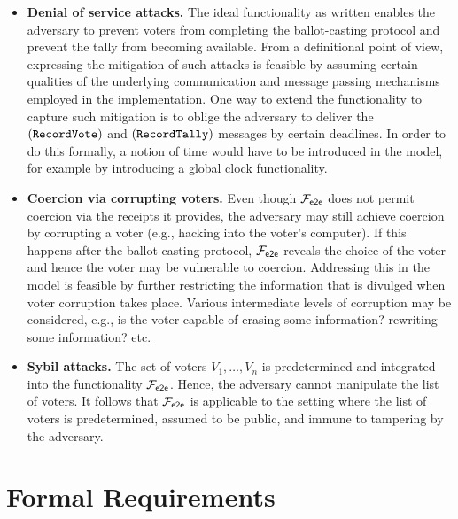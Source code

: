 \begin{itemize}
\item \textbf{Denial of service attacks.} The ideal functionality as
  written enables the adversary to prevent voters from completing the
  ballot-casting protocol and prevent the tally from becoming
  available. From a definitional point of view, expressing the
  mitigation of such attacks is feasible by assuming certain qualities
  of the underlying communication and message passing mechanisms
  employed in the implementation. One way to extend the functionality
  to capture such mitigation is to oblige the adversary to deliver the
  $(\mathtt{RecordVote})$ and $(\mathtt{RecordTally})$ messages by certain
  deadlines. In order to do this formally, a notion of time would have
  to be introduced in the model, for example by introducing a global
  clock functionality.

\item \textbf{Coercion via corrupting voters.} Even though $\mathcal{F}_{\mathsf{e2e}}$
  does not permit coercion via the receipts it provides, the adversary
  may still achieve coercion by corrupting a voter (e.g., hacking into
  the voter's computer). If this happens after the ballot-casting
  protocol, $\mathcal{F}_{\mathsf{e2e}}$ reveals the choice of the voter and hence the
  voter may be vulnerable to coercion.  Addressing this in the model
  is feasible by further restricting the information that is divulged
  when voter corruption takes place. Various intermediate levels of
  corruption may be considered, e.g., is the voter capable of erasing
  some information? rewriting some information? etc.

\item \textbf{Sybil attacks.} The set of voters $V_1,\ldots,V_n$ is
  predetermined and integrated into the functionality $\mathcal{F}_{\mathsf{e2e}}$. Hence,
  the adversary cannot manipulate the list of voters.  It follows that
  $\mathcal{F}_{\mathsf{e2e}}$ is applicable to the setting where the list of voters is
  predetermined, assumed to be public, and immune to tampering by the
  adversary. 
\end{itemize}

\section{Formal Requirements}
